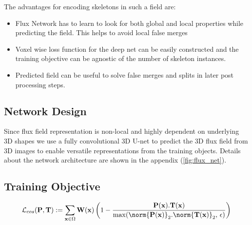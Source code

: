 

The advantages for encoding skeletons in such a field are:
\begin{itemize}
	\item Flux Network has to learn to look for both global and local properties while predicting the field. This helps to avoid local false merges
	\item Voxel wise loss function for the deep net can be easily constructed and the training objective can be agnostic of the number of skeleton instances.
	\item Predicted field can be useful to solve false merges and splits in later post processing steps.
\end{itemize}


\subsection{Network Design}
Since flux field representation is non-local and highly dependent on underlying 3D shapes we use a fully convolutional 3D U-net to predict the 3D flux field from 3D images to enable versatile representations from the training objects. Details about the network architecture are shown in the appendix (\autoref{fig:flux_net}).

\subsection{Training Objective}

\begin{equation}\label{eqn:cosineLoss}
\mathcal{L}_{cos}(\mathbf{P}, \mathbf{T}) := \sum_{\mathbf{x} \in \Omega} \mathbf{W}(\mathbf{x})\left( 1 - \frac{\mathbf{P}(\mathbf{x}).\mathbf{T}(\mathbf{x})}{\max(\norm{\mathbf{P}(\mathbf{x})}_2.\norm{\mathbf{T}(\mathbf{x})}_2,\,\epsilon)} \right)
\end{equation}

